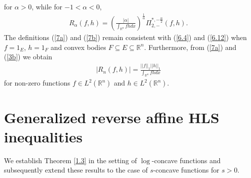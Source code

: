 \documentclass[preprint,12pt]{elsarticle}
\begin{document}
for $\alpha > 0$, while for $-1<\alpha<0$,
\begin{eqnarray}\label{7b}
	{R}_{\alpha }(f,h)=\left(\frac{|\alpha|}{{\int_{\mathbb{R}^n} }fhdx }\right)^{\frac{1}{\alpha}}{\Pi }_{2,-}^{*,-\frac{\alpha }{2} }(f,h).
\end{eqnarray}	
The definitions  (\ref{7a}) and  (\ref{7b}) remain consistent with (\ref{6.4}) and  (\ref{6.12}) when $f={1}_{E}$, $h={1}_{F}$ and convex bodies $F \subseteq E \subseteq \mathbb{R}^n$. Furthermore, from (\ref{7a}) and (\ref{3b}) we obtain
\begin{eqnarray}\label{7c}
	|{R}_{n}(f,h)|=\frac{{||f||}_{1}{||h||}_{1}}{{\int_{\mathbb{R}^n} }fhdx}
\end{eqnarray}	
for non-zero functions $f\in {L}^{2} (\mathbb{R}^n)$ and $h\in {L}^{2} (\mathbb{R}^n)$.
\section{Generalized reverse affine HLS inequalities}\label{7}

We establish Theorem \ref{1.3} in the setting of $\log$-concave functions and subsequently extend these results to the case of $s$-concave functions for $s>0$. 
\end{document}

